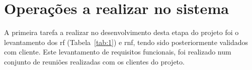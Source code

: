 \section{Operações a realizar no sistema}
A primeira tarefa a realizar no desenvolvimento desta etapa do projeto foi o levantamento dos \acrfull{rf} (Tabela~\ref{tab:1}) e \acrfull{rnf}, tendo sido posteriormente validados com cliente. Este levantamento de requisitos funcionais, foi realizado num conjunto de reuniões realizadas com os clientes do projeto.

